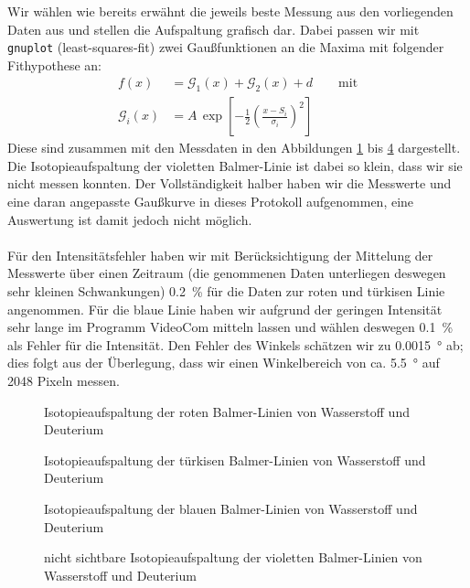 \documentclass[11pt, a4paper]{article}
\numberwithin{equation}{section}
\begin{document}
Wir wählen wie bereits erwähnt die jeweils beste Messung aus den vorliegenden Daten aus und stellen die Aufspaltung grafisch dar.
Dabei passen wir mit \texttt{gnuplot} (least-squares-fit) zwei Gaußfunktionen an die Maxima mit folgender Fithypothese an:
\begin{align}
f(x)&=\mathcal{G}_1(x)+\mathcal{G}_2(x) + d\qquad\text{mit}\\
\mathcal{G}_i(x)&=A\,\exp\left[-\frac{1}{2}\left(\frac{x-S_i}{\sigma_i}\right)^2\right]
\end{align}
Diese sind zusammen mit den Messdaten in den Abbildungen \ref{fig:aufspaltung_rot} bis  \ref{fig:aufspaltung_violett} dargestellt.
Die Isotopieaufspaltung der violetten Balmer-Linie ist dabei so klein, dass wir sie nicht messen konnten.
Der Vollständigkeit halber haben wir die Messwerte und eine daran angepasste Gaußkurve in dieses Protokoll aufgenommen, eine Auswertung ist damit jedoch nicht möglich.\\
\\
Für den Intensitätsfehler haben wir mit Berücksichtigung der Mittelung der Messwerte über einen Zeitraum (die genommenen Daten unterliegen deswegen sehr kleinen Schwankungen) \SI{0.2}{\percent} für die Daten zur roten und türkisen Linie angenommen.
Für die blaue Linie haben wir aufgrund der geringen Intensität sehr lange im Programm VideoCom mitteln lassen und wählen deswegen \SI{0.1}{\percent} als Fehler für die Intensität.
Den Fehler des Winkels schätzen wir zu \SI{0.0015}{\degree} ab; dies folgt aus der Überlegung, dass wir einen Winkelbereich von ca. \SI{5.5}{\degree} auf \num{2048} Pixeln messen.
\begin{figure}[h]
\centering

\caption{Isotopieaufspaltung der roten Balmer-Linien von Wasserstoff und Deuterium}
\label{fig:aufspaltung_rot}
\end{figure}
\begin{figure}[h]
\centering

\caption{Isotopieaufspaltung der türkisen Balmer-Linien von Wasserstoff und Deuterium}
\label{fig:aufspaltung_tuerkis}
\end{figure}
\begin{figure}[h]
\centering

\caption{Isotopieaufspaltung der blauen Balmer-Linien von Wasserstoff und Deuterium}
\label{fig:aufspaltung_blau}
\end{figure}
\begin{figure}[h]
\centering

\caption{nicht sichtbare Isotopieaufspaltung der violetten Balmer-Linien von Wasserstoff und Deuterium}
\label{fig:aufspaltung_violett}
\end{figure}
\end{document}
